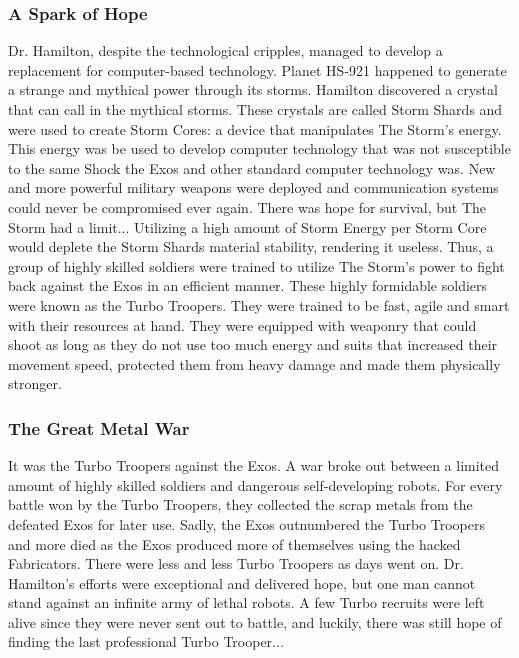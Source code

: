 \documentclass[12pt]{article}
\begin{document}
\subsubsection{A Spark of Hope}

Dr. Hamilton, despite the technological cripples, managed to develop a replacement for computer-based technology. Planet HS-921 happened to generate a strange and mythical power through its storms. Hamilton  discovered a crystal that can call in the mythical storms. These crystals are called Storm Shards and were used to create Storm Cores: a device that manipulates The Storm's energy. This energy was be used to develop computer technology that was not susceptible to the same Shock the Exos and other standard computer technology was. New and more powerful military weapons were deployed and communication systems could never be compromised ever again. There was hope for survival, but The Storm had a limit... Utilizing a high amount of Storm Energy per Storm Core would deplete the Storm Shards material stability, rendering it useless. Thus, a group of highly skilled soldiers were trained to utilize The Storm's power to fight back against the Exos in an efficient manner. These highly formidable soldiers were known as the Turbo Troopers. They were trained to be fast, agile and smart with their resources at hand. They were equipped with weaponry that could shoot as long as they do not use too much energy and suits that increased their movement speed, protected them from heavy damage and made them physically stronger. 

\subsubsection{The Great Metal War}

It was the Turbo Troopers against the Exos. A war broke out between a limited amount of highly skilled soldiers and dangerous self-developing robots. For every battle won by the Turbo Troopers, they collected the scrap metals from the defeated Exos for later use. Sadly, the Exos outnumbered the Turbo Troopers and more died as the Exos produced more of themselves using the hacked Fabricators. There were less and less Turbo Troopers as days went on. Dr. Hamilton's efforts were exceptional and delivered hope, but one man cannot stand against an infinite army of lethal robots. A few Turbo recruits were left alive since they were never sent out to battle, and luckily, there was still hope of finding the last professional Turbo Trooper...
\end{document}
